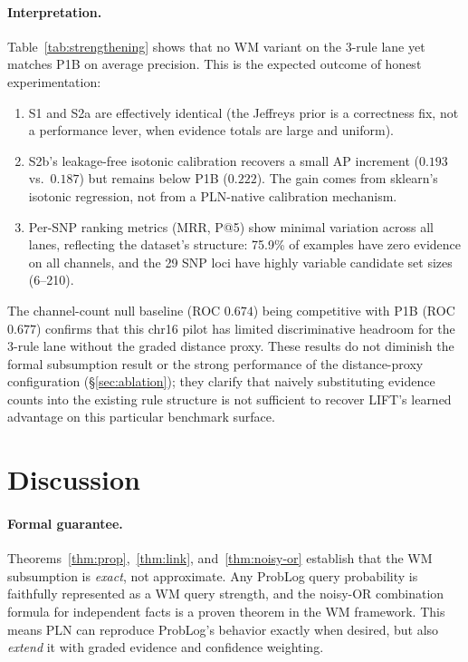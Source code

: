 \documentclass[]{article}
\begin{document}
\paragraph{Interpretation.}
Table~\ref{tab:strengthening} shows that no WM variant on the 3-rule
lane yet matches P1B on average precision.  This is the expected
outcome of honest experimentation:
\begin{enumerate}
\item S1 and S2a are effectively identical (the Jeffreys prior is a
  correctness fix, not a performance lever, when evidence totals are
  large and uniform).
\item S2b's leakage-free isotonic calibration recovers a small AP
  increment ($0.193$ vs.\ $0.187$) but remains below P1B ($0.222$).
  The gain comes from sklearn's isotonic regression, not from a
  PLN-native calibration mechanism.
\item Per-SNP ranking metrics (MRR, P@5) show minimal variation
  across all lanes, reflecting the dataset's structure: 75.9\% of
  examples have zero evidence on all channels, and the 29 SNP loci
  have highly variable candidate set sizes (6--210).
\end{enumerate}
The channel-count null baseline (ROC $0.674$) being competitive with
P1B (ROC $0.677$) confirms that this chr16 pilot has limited
discriminative headroom for the 3-rule lane without the graded
distance proxy.  These results do not diminish the formal subsumption
result or the strong performance of the distance-proxy configuration
(\S\ref{sec:ablation}); they clarify that naively substituting
evidence counts into the existing rule structure is not sufficient to
recover LIFT's learned advantage on this particular benchmark surface.

\section{Discussion}
\label{sec:discussion}

\paragraph{Formal guarantee.}
Theorems~\ref{thm:prop},~\ref{thm:link}, and~\ref{thm:noisy-or} establish that
the WM subsumption is \emph{exact}, not approximate.  Any ProbLog query probability
is faithfully represented as a WM query strength, and the noisy-OR combination
formula for independent facts is a proven theorem in the WM framework.  This means
PLN can reproduce ProbLog's behavior exactly when desired, but also \emph{extend}
it with graded evidence and confidence weighting.
\end{document}
